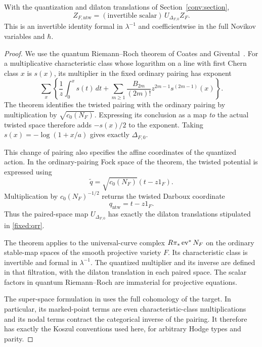 \begin{lemma}
\label{fixed:qrr-normalized}
With the quantization and dilaton translations of
Section~\ref{conv:section},
\begin{equation}\label{fixed:qrr}
 Z_{F,\mathrm{ntw}}=(\text{invertible scalar})\,
                     U_{\Delta_{F,0}}Z_F.
\end{equation}
This is an invertible identity formal in $\lambda^{-1}$ and coefficientwise
in the full Novikov variables and $\hbar$.
\end{lemma}

\begin{proof}
We use the quantum Riemann--Roch theorem of Coates and
Givental~\cite[Theorem~1]{QRR}.  For a multiplicative characteristic class
whose logarithm on a line with first Chern class $x$ is $s(x)$, its
multiplier in the fixed ordinary pairing has exponent
\[
 \sum_x\left\{\frac1z\int_0^x s(t)\,dt+
       \sum_{m\geq1}\frac{B_{2m}}{(2m)!}z^{2m-1}
                                         s^{(2m-1)}(x)\right\}.
\]
The theorem identifies the twisted pairing with the ordinary pairing by
multiplication by $\sqrt{c_0(N_F)}$.  Expressing its conclusion as a map
\emph{to} the actual twisted space therefore adds $-s(x)/2$ to the
exponent.  Taking $s(x)=-\log(1+x/a)$ gives exactly
$\Delta_{F,0}$.

This change of pairing also specifies the affine coordinates of the
quantized action.  In the ordinary-pairing Fock space of the theorem,
the twisted potential is expressed using
\[
 \widetilde q=\sqrt{c_0(N_F)}(t-z1_F).
\]
Multiplication by $c_0(N_F)^{-1/2}$ returns the twisted Darboux
coordinate
\[
 q_{\mathrm{ntw}}=t-z1_F.
\]
Thus the paired-space map
$U_{\Delta_{F,0}}$ has exactly the dilaton translations stipulated in
\eqref{fixed:qrr}.

The theorem applies to the universal-curve complex
$R\pi_*\operatorname{ev}^*N_F$ on the ordinary stable-map spaces of the smooth
projective variety $F$.  Its characteristic class is invertible and
formal in $\lambda^{-1}$.  The quantized multiplier and its inverse are
defined in that filtration, with the dilaton translation in each paired
space.  The scalar factors in quantum Riemann--Roch are immaterial for
projective equations.

The super-space formulation in \cite[Sections~2--3]{QRR} uses the full
cohomology of the target.  In particular, its marked-point terms are
even characteristic-class multiplications and its nodal terms contract
the categorical inverse of the pairing.  It therefore has exactly the
Koszul conventions used here, for arbitrary Hodge types and parity.
\end{proof}

